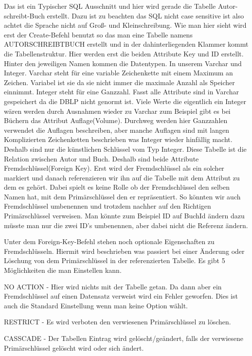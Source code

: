 Das ist ein Typischer SQL Ausschnitt und hier wird gerade die Tabelle Autor-schreibt-Buch erstellt. Dazu ist zu beachten das SQL nicht case sensitive ist also achtet die Sprache nicht auf Groß- und Kleinschreibung. Wie man hier sieht wird erst der Create-Befehl benutzt so das man eine Tabelle namens AUTORSCHREIBTBUCH erstellt und in der dahinterliegenden Klammer kommt die Tabellenstruktur. Hier werden erst die beiden Attribute Key und ID erstellt. Hinter den jeweiligen Namen kommen die Datentypen. In unserem Varchar und Integer. Varchar steht für eine variable Zeichenkette mit einem Maximum an Zeichen. Variabel ist sie da sie nicht immer die maximale Anzahl als Speicher einnimmt. Integer steht für eine Ganzzahl. Fasst alle Attribute sind in Varchar gespeichert da die DBLP nicht genormt ist. Viele Werte die eigentlich ein Integer wären werden durch Ausnahmen wieder zu Varchar zum Beispiel gibt es bei Büchern das Attribut Auflage(Volume). Durchweg werden hier Ganzzahlen verwendet die Auflagen beschreiben, aber manche Auflagen sind mit langen Komplizierten Zeichenketten beschrieben was Integer wieder hinfällig macht. Deshalb sind nur die künstlichen Schlüssel vom Typ Integer. Diese Tabelle ist die Relation zwischen Autor und Buch. Deshalb sind beide Attribute Fremdschlüssel(Foreign Key). Erst wird der Fremdschlüssel als ein solcher markiert und danach referenzieren wir ihn auf die Tabelle mit dem Attribut zu dem es gehört. Dabei spielt es keine Rolle ob der Fremdschlüssel den selben Namen hat, mit dem Primärschlüssel den er repräsentiert. So könnten wir auch Fremdschlüssel umbenennen und trotzdem nachher auf den Richtigen Primärschlüssel verweisen.
Man könnte zum Beispiel ID auf BuchId ändern dazu müsste man nur die zwei ID's umbenennen, aber dabei nicht die Referenz ändern.

Unter dem Foreign-Key-Befehl stehen noch optionale Eigenschaften zu Fremdschlüsseln. Hiermit wird beschrieben was passiert bei einer Änderung oder Löschung von dem Primärschlüssel in der referenzierten Tabelle. Es gibt 5 Möglichkeiten die man Einstellen kann.

NO ACTION - Hier wird nichts mit der Tabelle getan. Da dann aber ein Fremdschlüssel auf einen Datensatz verweist wird ein Fehler geworfen. Dies ist auch die Standard Einstellung wenn man keine Option wählt.

RESTRICT - Es wird verboten den verwiesenen Primärschlüssel zu löschen.

CASSCADE - Der Tabellen Eintrag wird gelöscht/geändert, falls der verwiesene Primärschlüssel gelöscht wird oder sich ändert.

